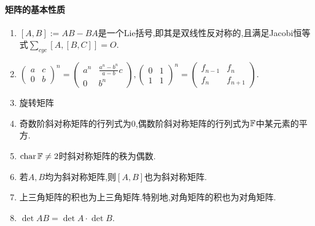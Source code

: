 \documentclass[openany]{book}
\begin{document}
\paragraph{矩阵的基本性质}
\begin{enumerate}
    \item $[A,B]:=AB-BA$是一个Lie括号,即其是双线性反对称的,且满足Jacobi恒等式$\sum_{cyc}[A,[B,C]]=O$.
    \item $\begin{pmatrix}
        a&c\\0&b
    \end{pmatrix}^n=\begin{pmatrix}
        a^n&\frac{a^n-b^n}{a-b}c\\0&b^n
    \end{pmatrix},\begin{pmatrix}
        0&1\\1&1
    \end{pmatrix}^n=\begin{pmatrix}
        f_{n-1}&f_n\\f_n&f_{n+1}
    \end{pmatrix}$.
    \item 旋转矩阵
    \item 奇数阶斜对称矩阵的行列式为0,偶数阶斜对称矩阵的行列式为$\mathbb{F}$中某元素的平方.
    \item $\operatorname{char} \mathbb{F}\neq 2$时斜对称矩阵的秩为偶数.
    \item 若$A,B$均为斜对称矩阵,则$[A,B]$也为斜对称矩阵.
    \item 上三角矩阵的积也为上三角矩阵.特别地,对角矩阵的积也为对角矩阵.
    \item $\det AB=\det A\cdot\det B$.
\end{enumerate}
\end{document}
